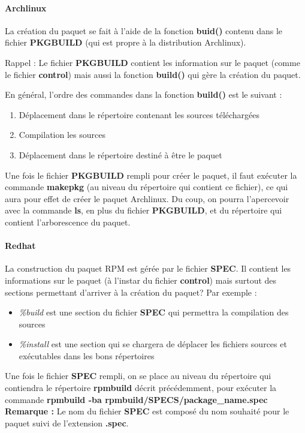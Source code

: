 \documentclass[12pt,a4paper]{article}
\newenvironment{remarque}{\textbf{Remarque :}}{}
\begin{document}
\paragraph{Archlinux} La création du paquet se fait à l'aide de la fonction \textbf{buid()} contenu dans le fichier \textbf{PKGBUILD} (qui est propre à la distribution Archlinux).

Rappel : Le fichier \textbf{PKGBUILD} contient les information sur le paquet (comme le fichier \textbf{control}) mais aussi la fonction \textbf{build()} qui gère la création du paquet.

En général, l'ordre des commandes dans la fonction \textbf{build()} est le suivant :
\begin{enumerate}
	\item Déplacement dans le répertoire contenant les sources téléchargées 
	\item Compilation les sources
	\item Déplacement dans le répertoire destiné à être le paquet
\end{enumerate}

Une fois le fichier \textbf{PKGBUILD} rempli pour créer le paquet, il faut exécuter la commande \textbf{makepkg} (au niveau du répertoire qui contient ce fichier), ce qui aura pour effet de créer le paquet Archlinux. Du coup, on pourra l'apercevoir avec la commande \textbf{ls}, en plus du fichier \textbf{PKGBUILD}, et du répertoire qui contient l'arborescence du paquet.
\paragraph{Redhat} La construction du paquet RPM est gérée par le fichier \textbf{SPEC}. Il contient les informations sur le paquet (à l'instar du fichier \textbf{control}) mais surtout des sections permettant d'arriver à la création du paquet? Par exemple :
\begin{itemize}
	\item \textit{\%build} est une section du fichier \textbf{SPEC} qui permettra la compilation des sources
	\item \textit{\%install} est une section qui se chargera de déplacer les fichiers sources et exécutables dans les bons répertoires
\end{itemize}
Une fois le fichier \textbf{SPEC} rempli, on se place au niveau du répertoire qui contiendra le répertoire \textbf{rpmbuild} décrit précédemment, pour exécuter la commande \textbf{rpmbuild -ba rpmbuild/SPECS/package\_name.spec}
\begin{remarque} Le nom du fichier \textbf{SPEC} est composé du nom souhaité pour le paquet suivi de l'extension \textbf{.spec}.\end{remarque}
\end{document}
